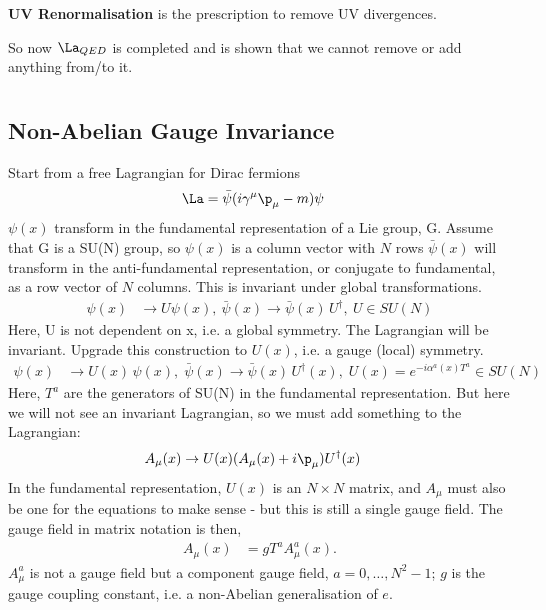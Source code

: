 \documentclass[relqm.tex]{subfiles}
\begin{document}
\textbf{UV Renormalisation} is the prescription to remove UV divergences.

So now $\La_{QED}$ is completed and is shown that we cannot remove or add anything from/to it. 

\chapter{}
\section{Non-Abelian Gauge Invariance}
Start from a free Lagrangian for Dirac fermions
\begin{align}
    \La &= \bar{\psi}(i\gamma^\mu\p_\mu - m)\psi
\end{align}
$\psi(x)$ transform in the fundamental representation of a Lie group, G. 
Assume that G is a SU(N) group, so $\psi(x)$ is a column vector with $N$ rows 
$\bar{\psi}(x)$ will transform in the anti-fundamental representation, or conjugate to fundamental, as a row vector of $N$ columns.
This is invariant under global transformations. 
\begin{align}
    \psi(x) &\to U\psi(x),~ \bar{\psi}(x) \to \bar{\psi}(x)\,U^\dagger,~ U \in SU(N)
\end{align}
Here, U is not dependent on x, i.e. a global symmetry. 
The Lagrangian will be invariant. 
Upgrade this construction to $U(x)$, i.e. a gauge (local) symmetry. 
\begin{align}
    \psi(x)&\to U(x)\,\psi(x),\; \bar{\psi}(x) \to \bar{\psi}(x)\,U^\dagger(x),\; U(x) = e^{-i\alpha^a(x)T^a} \in SU(N) 
\end{align}
Here, $T^a$ are the generators of SU(N) in the fundamental representation. 
But here we will not see an invariant Lagrangian, so we must add something to the Lagrangian:
\begin{align}
    A_\mu(x) &\to U(x)(A_\mu(x)+i\p_\mu)U^\dagger(x)
\end{align}
In the fundamental representation, $U(x)$ is an $N\times N$ matrix, and $A_\mu$ must also be one for the equations to make sense - but this is still a single gauge field. 
The gauge field in matrix notation is then,
\begin{align}
    A_\mu(x) &= gT^aA_\mu^a(x).
\end{align}
$A_\mu^a$ is not a gauge field but a component gauge field, $a=0,\dots,N^2-1$; $g$ is the gauge coupling constant, i.e. a non-Abelian generalisation of $e$.
\end{document}
